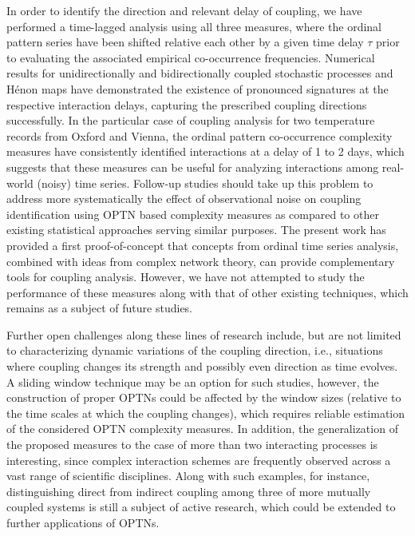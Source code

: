 \documentclass[12pt,aip,cha,reprint,nofootinbib]{revtex4-1}
\begin{document}
In order to identify the direction and relevant delay of coupling, we have performed a time-lagged analysis using all three measures, where the ordinal pattern series have been shifted relative each other by a given time delay $\tau$ prior to evaluating the associated empirical co-occurrence frequencies. Numerical results for unidirectionally and bidirectionally coupled stochastic processes and H\'enon maps have demonstrated the existence of pronounced signatures at the respective interaction delays, capturing the prescribed coupling directions successfully. In the particular case of coupling analysis for two temperature records from Oxford and Vienna, the ordinal pattern co-occurrence complexity measures have consistently identified interactions at a delay of 1 to 2 days, which suggests that these measures can be useful for analyzing interactions among real-world (noisy) time series. Follow-up studies should take up this problem to address more systematically the effect of observational noise on coupling identification using OPTN based complexity measures as compared to other existing statistical approaches serving similar purposes. The present work has provided a first proof-of-concept that concepts from ordinal time series analysis, combined with ideas from complex network theory, can provide complementary tools for coupling analysis. However, we have not attempted to study the performance of these measures along with that of other existing techniques, which remains as a subject of future studies.

Further open challenges along these lines of research include, but are not limited to characterizing dynamic variations of the coupling direction, i.e., situations where coupling changes its strength and possibly even direction as time evolves. A sliding window technique may be an option for such studies, however, the construction of proper OPTNs could be affected by the window sizes (relative to the time scales at which the coupling changes), which requires reliable estimation of the considered OPTN complexity measures. In addition, the generalization of the proposed measures to the case of more than two interacting processes is interesting, since complex interaction schemes are frequently observed across a vast range of scientific disciplines. Along with such examples, for instance, distinguishing direct from indirect coupling among three of more mutually coupled systems is still a subject of active research, which could be extended to further applications of OPTNs. 
\end{document}
